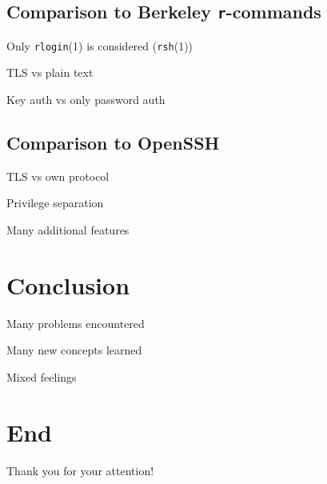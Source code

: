 \documentclass[
	xcolor=dvipsnames,
	handout
]{beamer}
\newenvironment{zhawframe}[1][]
{\begin{frame}[environment=fr,#1]{\insertsubsectionhead}{\insertsectionhead}}
{\end{frame}
}
\begin{document}
\subsection{Comparison to Berkeley \texttt{r}-commands}
\begin{zhawframe}
 Only \texttt{rlogin}(1) is considered (\texttt{rsh}(1))

 TLS vs plain text

 Key auth vs only password auth
\end{zhawframe}

\subsection{Comparison to OpenSSH}
\begin{zhawframe}
 TLS vs own protocol

 Privilege separation

 Many additional features
\end{zhawframe}

\section{Conclusion}
\begin{zhawframe}
 Many problems encountered

 Many new concepts learned

 Mixed feelings
\end{zhawframe}

\section{End}
\begin{zhawframe}
Thank you for your attention!
\end{zhawframe}
\end{document}
